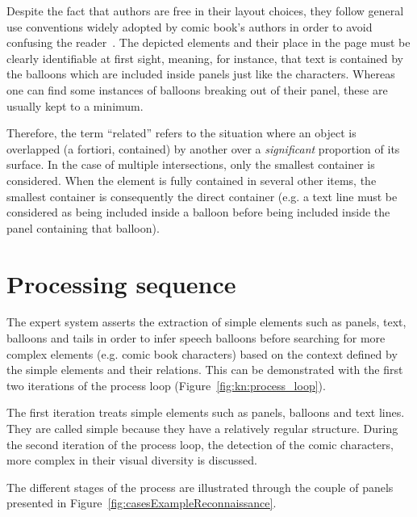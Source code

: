 Despite the fact that authors are free in their layout choices, they follow general use conventions widely adopted by comic book's authors in order to avoid confusing the reader~\cite{Laine2010,duc1997art}.
The depicted elements and their place in the page must be clearly identifiable at first sight, meaning, for instance, that text is contained by the balloons which are included inside panels just like the characters.
Whereas one can find some instances of balloons breaking out of their panel, these are usually kept to a minimum.

Therefore, the term ``related'' refers to the situation where an object is overlapped (a fortiori, contained) by another over a \emph{significant} proportion of its surface.
In the case of multiple intersections, only the smallest container is considered.
When the element is fully contained in several other items, the smallest container is consequently the direct container (e.g. a text line must be considered as being included inside a balloon before being included inside the panel containing that balloon).

\section{Processing sequence} %
\label{sec:kn:processing_sequence}

The expert system asserts the extraction of simple elements such as panels, text, balloons and tails in order to infer speech balloons before searching for more complex elements (e.g. comic book characters) based on the context defined by the simple elements and their relations.
This can be demonstrated with the first two iterations of the process loop (Figure~\ref{fig:kn:process_loop}).

The first iteration treats simple elements such as panels, balloons and text lines.
They are called simple because they have a relatively regular structure.
During the second iteration of the process loop, the detection of the comic characters, more complex in their visual diversity is discussed.

The different stages of the process are illustrated through the couple of panels presented in Figure~\ref{fig:casesExampleReconnaissance}.

